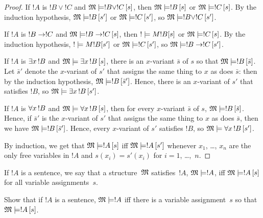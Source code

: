 \documentclass[open-logic-section]{subfiles}
\begin{document}
\begin{proof}
If $!A$ is $!B \lor !C$ and $\Sat{M}{!B \lor !C}[s]$, then
$\Sat{M}{!B}[s]$ or $\Sat{M}{!C}[s]$. By the induction hypothesis,
$\Sat{M}{!B}[s']$ or $\Sat{M}{!C}[s']$, so $\Sat{M}{!B \lor !C}[s']$.

If $!A$ is $!B \to !C$ and $\Sat{M}{!B \lif !C}[s]$, then
$\Sat!{M}{!B}[s]$ or $\Sat{M}{!C}[s]$. By the induction hypothesis,
$\Sat!{M}{!B}[s']$ or $\Sat{M}{!C}[s']$, so $\Sat{M}{!B \lif !C}[s']$.

If $!A$ is $\lexists[x][!B]$ and $\Sat{M}{\lexists[x][!B]}[s]$, there
is an $x$-variant $\bar{s}$ of $s$ so that $\Sat{M}{!B}[\bar{s}]$. Let
$\bar{s}'$ denote the $x$-variant of $s'$ that assigns the same thing
to $x$ as does $\bar{s}$: then by the induction hypothesis,
$\Sat{M}{!B}[\bar{s}']$. Hence, there is an $x$-variant of $s'$ that
satisfies $!B$, so $\Sat{M}{\lexists[x][!B]}[s']$.

If $!A$ is $\lforall[x][!B]$ and $\Sat{M}{\lforall[x][!B]}[s]$, then
for every $x$-variant $\bar{s}$ of $s$, $\Sat{M}{!B}[\bar{s}]$. Hence,
if $\bar{s}'$ is the $x$-variant of $s'$ that assigns the same thing
to $x$ as does $\bar{s}$, then we have $\Sat{M}{!B}[\bar{s}']$. Hence,
every $x$-variant of $s'$ satisfies $!B$, so
$\Sat{M}{\lforall[x][!B]}[s']$.

By induction, we get that $\Sat{M}{!A}[s]$ iff $\Sat{M}{!A}[s']$
whenever $x_1$, \dots, $x_n$ are the only free variables in $!A$ and
$s(x_i)=s'(x_i)$ for $i=1$, \dots,~$n$.
\end{proof}
 
\begin{defn}
If $!A$ is a sentence, we say that a structure~$\mathfrak M$
satisfies~$!A$, $\Sat{M}{!A}$, iff $\Sat{M}{!A}[s]$ for all variable
assignments~$s$.
\end{defn}

\begin{prob}
Show that if $!A$ is a sentence, $\Sat{M}{!A}$ iff there is a variable
assignment~$s$ so that $\Sat{M}{!A}[s]$.
\end{prob}
\end{document}
